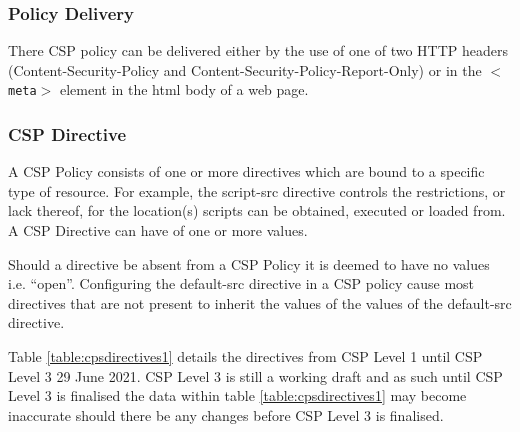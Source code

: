 \documentclass{mscreport}
\begin{document}
\subsubsection{Policy Delivery}
There CSP policy can be delivered either by the use of one of two HTTP headers (Content-Security-Policy and Content-Security-Policy-Report-Only) or in the \texttt{$<$meta$>$} element in the html body of a web page.

\subsubsection{CSP Directive}
A CSP Policy consists of one or more directives which are bound to a specific type of resource. For example, the script-src directive controls the restrictions, or lack thereof, for the location(s) scripts can be obtained, executed or loaded from. A CSP Directive can have of one or more values.

\vspace{0.3cm} \noindent
Should a directive be absent from a CSP Policy it is deemed to have no values i.e. ``open''. Configuring the default-src directive in a CSP policy cause most directives that are not present to inherit the values of the values of the default-src directive.

\vspace{0.3cm} \noindent
Table \ref{table:cpsdirectives1} details the directives from CSP Level 1 until CSP Level 3 29 June 2021. CSP Level 3 is still a working draft and as such until CSP Level 3 is finalised the data within table \ref{table:cpsdirectives1} may become inaccurate should there be any changes before CSP Level 3 is finalised.
\end{document}
